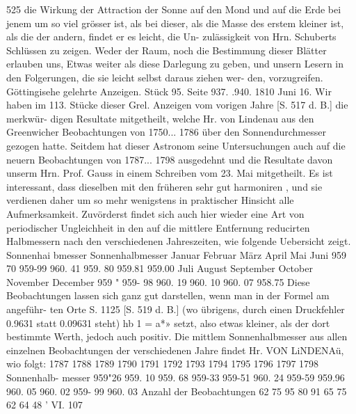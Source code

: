 \documentclass[12pt,a4paper]{article}
\begin{document}
525 die  Wirkung  der  Attraction  der  Sonne  auf  den  Mond  und  auf  die  Erde  bei  jenem  um  so  viel  grösser ist,  als  bei  dieser,  als  die  Masse  des  erstem  kleiner  ist,  als  die  der  andern,  findet  er  es  leicht,  die  Un- zulässigkeit von  Hrn.  Schuberts  Schlüssen  zu  zeigen. Weder  der  Raum,  noch  die  Bestimmung  dieser  Blätter  erlauben  uns,  Etwas  weiter  als  diese Darlegung  zu  geben,  und  unsern  Lesern  in  den  Folgerungen,  die  sie  leicht  selbst  daraus  ziehen  wer- den, vorzugreifen. Göttingisehe  gelehrte  Anzeigen.     Stück  95.     Seite  937.  .940.     1810  Juni  16. Wir  haben  im  113.  Stücke  dieser  Grel.  Anzeigen  vom  vorigen  Jahre  [S.  517  d.  B.]  die  merkwür- digen Resultate  mitgetheilt,  welche  Hr.  von  Lindenau  aus  den  Greenwicher  Beobachtungen  von  1750... 1786  über  den  Sonnendurchmesser  gezogen  hatte.  Seitdem  hat  dieser  Astronom  seine  Untersuchungen auch  auf  die  neuern  Beobachtungen  von  1787...  1798  ausgedehnt  und  die  Resultate  davon  unserm  Hrn. Prof.  Gauss  in  einem  Schreiben  vom  23.  Mai  mitgetheilt.  Es  ist  interessant,  dass  dieselben  mit  den früheren  sehr  gut  harmoniren ,  und  sie  verdienen  daher  um  so  mehr  wenigstens  in  praktischer  Hinsicht alle  Aufmerksamkeit.  Zuvörderst  findet  sich  auch  hier  wieder  eine  Art  von  periodischer  Ungleichheit in  den  auf  die  mittlere  Entfernung  reducirten  Halbmessern  nach  den  verschiedenen  Jahreszeiten,  wie folgende  Uebersicht  zeigt. Sonnenhai  bmesser  Sonnenhalbmesser Januar Februar März April Mai Juni 959  70 959-99 960.  41 959.  80 959.81 959.00 Juli August September October November December 959  " 959-  98 960.  19 960.  10 960.  07 958.75 Diese   Beobachtungen  lassen   sich  ganz   gut  darstellen,   wenn  man   in  der  Formel  am  angeführ- ten   Orte    S.  1125   [S.  519   d.   B.]     (wo    übrigens,   durch  einen   Druckfehler   0.9631   statt   0.09631     steht) hb 1  =  a*»    setzt,  also  etwas  kleiner,  als  der  dort  bestimmte  Werth,  jedoch  auch  positiv. Die  mittlem  Sonnenhalbmesser  aus  allen  einzelnen  Beobachtungen  der  verschiedenen  Jahre  findet Hr.  VON  LiNDENAü,  wio  folgt: 1787 1788 1789 1790 1791 1792 1793 1794 1795 1796 1797 1798 Sonnenhalb- messer 959"26 959. 10 959. 68 959-33 959-51 960. 24 959-59 959.96 960. 05 960. 02 959-  99 960.  03 Anzahl  der Beobachtungen 62 75 95 80 91 65 75 62 64 48 '  VI. 107

\vspace{0.5em}
\end{document}
